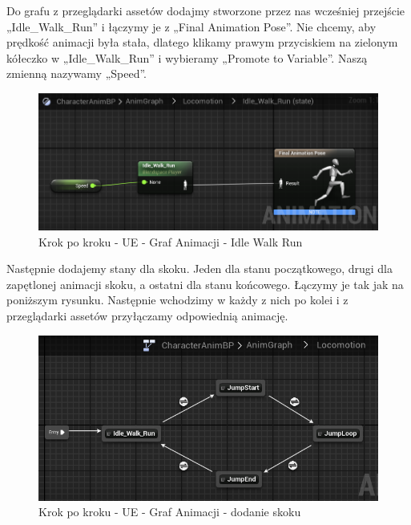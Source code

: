 \documentclass[12pt]{xmgr}
\begin{document}
Do grafu z przeglądarki assetów dodajmy stworzone przez nas wcześniej przejście „Idle\_Walk\_Run” i łączymy je z „Final Animation Pose”.  Nie chcemy, aby prędkość animacji była stała, dlatego klikamy prawym przyciskiem na zielonym kółeczko w „Idle\_Walk\_Run” i wybieramy „Promote to Variable”. Naszą zmienną nazywamy „Speed”.

\begin{figure}[!htb]
    \begin{center}
    \includegraphics[scale=0.6]{Screeny/UeKrokPoKroku/UE-AnimGraph-IdleWalkRun.png}
    \end{center}
    \caption{Krok po kroku - UE - Graf Animacji - Idle Walk Run}
\end{figure}

\newpage
Następnie dodajemy stany dla skoku. Jeden dla stanu początkowego, drugi dla zapętlonej animacji skoku, a ostatni dla stanu końcowego. Łączymy je tak jak na poniższym rysunku. Następnie wchodzimy w każdy z nich po kolei i z przeglądarki assetów przyłączamy odpowiednią animację.

\begin{figure}[!htb]
    \begin{center}
    \includegraphics[scale=0.6]{Screeny/UeKrokPoKroku/UE-AnimGraph-Anim.png}
    \end{center}
    \caption{Krok po kroku - UE -  Graf Animacji - dodanie skoku}
\end{figure}
\end{document}
